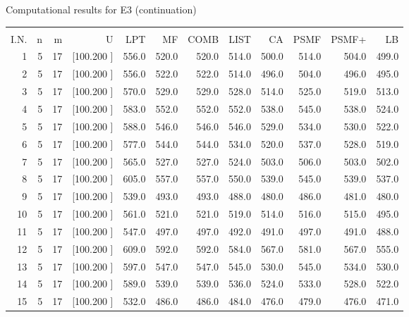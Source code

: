 \documentclass[12pt,a4paper]{article}
\begin{document}
\newpage
\begin{center}
 Computational results for E3 (continuation) {\tiny
\begin{tabular}{r r r r r r r r r r r r}\hline
    &   &   &          &        &        &        &        &        &        &        &       \\[-0.1in]
  I.N.  &  n  &  m  &  U  &  LPT  &  MF  &  COMB  &  LIST  &  CA  & PSMF &PSMF+ & LB \\[0.03in]
\hline
   1&  5& 17&[100.200   ]&   556.0&   520.0&   520.0&   514.0&   500.0&   514.0&   504.0&   499.0\\[-0.02in]
   2&  5& 17&[100.200   ]&   556.0&   522.0&   522.0&   514.0&   496.0&   504.0&   496.0&   495.0\\[-0.02in]
   3&  5& 17&[100.200   ]&   570.0&   529.0&   529.0&   528.0&   514.0&   525.0&   519.0&   513.0\\[-0.02in]
   4&  5& 17&[100.200   ]&   583.0&   552.0&   552.0&   552.0&   538.0&   545.0&   538.0&   524.0\\[-0.02in]
   5&  5& 17&[100.200   ]&   588.0&   546.0&   546.0&   546.0&   529.0&   534.0&   530.0&   522.0\\[-0.02in]
   6&  5& 17&[100.200   ]&   577.0&   544.0&   544.0&   534.0&   520.0&   537.0&   528.0&   519.0\\[-0.02in]
   7&  5& 17&[100.200   ]&   565.0&   527.0&   527.0&   524.0&   503.0&   506.0&   503.0&   502.0\\[-0.02in]
   8&  5& 17&[100.200   ]&   605.0&   557.0&   557.0&   550.0&   539.0&   545.0&   539.0&   537.0\\[-0.02in]
   9&  5& 17&[100.200   ]&   539.0&   493.0&   493.0&   488.0&   480.0&   486.0&   481.0&   480.0\\[-0.02in]
  10&  5& 17&[100.200   ]&   561.0&   521.0&   521.0&   519.0&   514.0&   516.0&   515.0&   495.0\\[-0.02in]
  11&  5& 17&[100.200   ]&   547.0&   497.0&   497.0&   492.0&   491.0&   497.0&   491.0&   488.0\\[-0.02in]
  12&  5& 17&[100.200   ]&   609.0&   592.0&   592.0&   584.0&   567.0&   581.0&   567.0&   555.0\\[-0.02in]
  13&  5& 17&[100.200   ]&   597.0&   547.0&   547.0&   545.0&   530.0&   545.0&   534.0&   530.0\\[-0.02in]
  14&  5& 17&[100.200   ]&   589.0&   539.0&   539.0&   536.0&   524.0&   533.0&   528.0&   522.0\\[-0.02in]
  15&  5& 17&[100.200   ]&   532.0&   486.0&   486.0&   484.0&   476.0&   479.0&   476.0&   471.0\\[-0.02in]

\end{tabular}}
\end{center}
\end{document}

